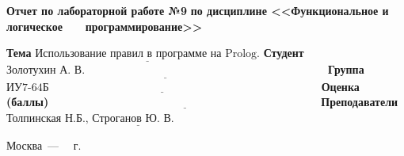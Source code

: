 \documentclass[12pt]{report}
\begin{document}
\begin{titlepage}
		\begin{center}
			\noindent\begin{minipage}{1.1\textwidth}\centering
				\Large\textbf{Отчет по лабораторной работе №9}\newline
				\textbf{по дисциплине <<Функциональное и логическое}\newline
				\textbf{~~~программирование>>}\newline\newline
			\end{minipage}
		\end{center}
		
		\noindent\textbf{Тема} $\underline{\text{Использование правил в программе на Prolog.}}$\newline\newline
		\noindent\textbf{Студент} $\underline{\text{Золотухин А. В.~~~~~~~~~~~~~~~~~~~~~~~~~~~~~~~~~~~~~~~~~~~~~~~~~~~~~~~~~~~~~~~~~}}$\newline\newline
		\noindent\textbf{Группа} $\underline{\text{ИУ7-64Б~~~~~~~~~~~~~~~~~~~~~~~~~~~~~~~~~~~~~~~~~~~~~~~~~~~~~~~~~~~~~~~~~~~~~~~~~}}$\newline\newline
		\noindent\textbf{Оценка (баллы)} $\underline{\text{~~~~~~~~~~~~~~~~~~~~~~~~~~~~~~~~~~~~~~~~~~~~~~~~~~~~~~~~~~~~~~~~~~~~~~~~}}$\newline\newline
		\noindent\textbf{Преподаватели} $\underline{\text{Толпинская Н.Б., Строганов Ю. В.~~~~~~~~~~~~~~~~~~~~~~~~~~}}$\newline\newline\newline
		
		\begin{center}
			\vfill
			Москва~---~\the\year
			~г.
		\end{center}
	\end{titlepage}
\end{document}
